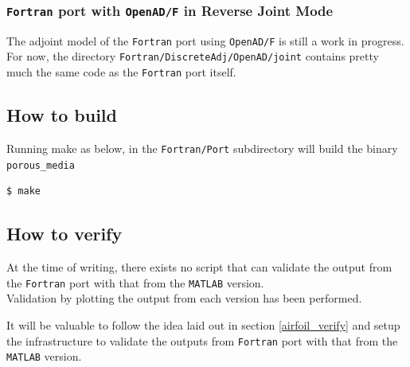 \subsubsection{\texttt{Fortran} port with \texttt{OpenAD/F} in Reverse Joint Mode}
\begin{TodoPar}
\noindent The adjoint model of the \texttt{Fortran} port using \texttt{OpenAD/F} is still a work in progress. For now, the directory \texttt{Fortran/DiscreteAdj/OpenAD/joint} contains pretty much the same code as the \texttt{Fortran} port itself.
\end{TodoPar}
\subsection{How to build}
Running make as below, in the \texttt{Fortran/Port} subdirectory will build the  binary \texttt{porous\_media}
\hfill\break
\begin{lstlisting}[language=mybash, numbers=none]
    $ make
\end{lstlisting}
\subsection{How to verify}
At the time of writing, there exists no script that can validate the output from the \texttt{Fortran} port with that from the \texttt{MATLAB} version. \\

\noindent Validation by plotting the output from each version has been performed. 

\begin{TodoPar}
\noindent It will be valuable to follow the idea laid out in section \ref{airfoil_verify} and setup the infrastructure to validate the outputs from \texttt{Fortran} port with that from the \texttt{MATLAB} version.
\end{TodoPar}

